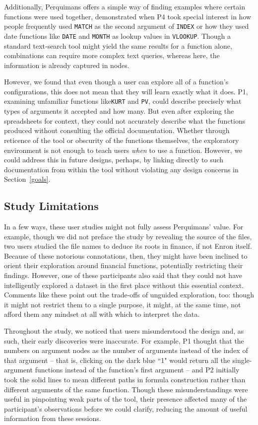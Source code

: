 \documentclass[conference]{IEEEtran}
\newcommand{\toolname}{Perquimans\xspace} \newcommand{\toolnameend}{Perquimans}
\newcommand{\toolnameposs}{Perquimans' }
\begin{document}
	Additionally, \toolname offers a simple way of finding examples where certain
	functions were used together, demonstrated when P4 took special interest in how
	people frequently used \texttt{MATCH} as the second argument of \texttt{INDEX} or how they used
	date functions like \texttt{DATE} and \texttt{MONTH} as lookup values in \texttt{VLOOKUP}. Though a
	standard text-search tool might yield the same results for a function alone,
	combinations can require more complex text queries, whereas here, the
	information is already captured in nodes. 
	
	However, we found that even though a user can explore all of a function's
	configurations, this does not mean that they will learn exactly what it does.
	P1, examining unfamiliar functions like\texttt{KURT} and \texttt{PV}, could describe precisely
	what types of arguments it accepted and how many. But even after exploring the
	spreadsheets for context, they could not accurately describe what the functions
	produced without consulting the official documentation. Whether through
	reticence of the tool or obscurity of the functions themselves, the exploratory
	environment is not enough to teach users \textit{when} to use a function.
	However, we could address this in future designs, perhaps, by linking directly
	to such documentation from within the tool without violating any design
	concerns in Section~\ref{goals}. 
	
	\subsection{Study Limitations} \label{subsec:studylimitations} 
	
	In a few ways, these user studies might not fully assess \toolnameposs value.
	For example, though we did not preface the study by revealing the source of the
	files, two users studied the file names to deduce its roots in finance, if not
	Enron itself. Because of these notorious connotations, then, they might have
	been inclined to orient their exploration around financial functions,
	potentially restricting their findings. However, one of these participants also
	said that they could not have intelligently explored a dataset in the first
	place without this essential context. Comments like these point out the
	trade-offs of unguided exploration, too: though it might not restrict them to a
	single purpose, it might, at the same time, not afford them any mindset at all
	with which to interpret the data. 
	
	Throughout the study, we noticed that users misunderstood the design
	and, as such, their early discoveries were inaccurate. For example, P1
	thought that the numbers on argument nodes as the number of arguments instead
	of the index of that argument -- that is, clicking on the dark blue
	``1" would return all the single-argument functions instead of the function's
	first argument -- and P2 initially took the solid lines to mean
	different paths in formula construction rather than different arguments of the
	same function. Though these misunderstandings were useful in pinpointing weak
	parts of the tool, their presence affected many of the participant's observations before we
	could clarify, reducing the amount of useful information from these sessions.
	
\end{document}
